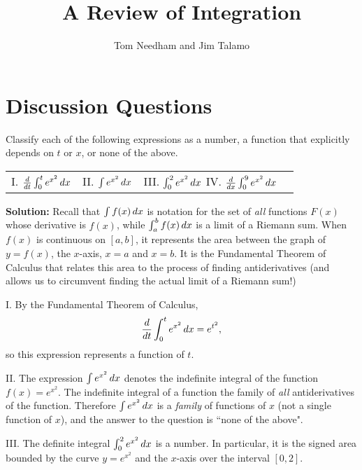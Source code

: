 \documentclass[handout,hints]{ximera}
\author{Tom Needham and Jim Talamo}
\title[]{A Review of Integration}
\begin{document}
\begin{abstract}
\end{abstract}
\maketitle

\vspace{-0.9in}

\section{Discussion Questions}

\begin{problem}
Classify each of the following expressions as a number, a function that explicitly depends on $t$ or $x$, or none of the above.


\begin{tabular}{llll}
I. $\frac{\mathop{}\!d}{\mathop{}\!d t} \int_0^t e^{x^2} \mathop{}\!d x$ \hspace{0.2in} & II. $\int e^{x^2} \mathop{}\!d x$ \hspace{0.2in} & III. $\int_0^2 e^{x^2} \mathop{}\!d x$ \hspace{0.2in}
IV. $\frac{d}{dx} \int_0^9 e^{x^2} \mathop{}\!d x$
\end{tabular}

\end{problem}

\textbf{Solution:} 
Recall that $\int f(x) \mathop{}\!d x$ is notation for the set of \emph{all} functions $F(x)$ whose derivative is $f(x)$, while $\int_a^b f(x) \mathop{}\!d x$ is a limit of a Riemann sum.  When $f(x)$ is continuous on $[a,b]$, it represents the area between the graph of $y=f(x)$, the $x$-axis, $x=a$ and $x=b$.
It is the Fundamental Theorem of Calculus that relates this area to the process of finding antiderivatives (and allows us to circumvent finding the actual limit of a Riemann sum!)

I. By the Fundamental Theorem of Calculus, 
$$
\frac{\mathop{}\!d}{\mathop{}\!d t} \int_0^t e^{x^2} \mathop{}\!d x = e^{t^2},
$$
so this expression represents a function of $t$.

II. The expression $\int e^{x^2} \mathop{}\!d x$ denotes the indefinite integral of the function $f(x)=e^{x^2}$. The indefinite integral of a function the family of \textit{all} antiderivatives of the function. Therefore $\int e^{x^2} \mathop{}\!d x$ is a \emph{family} of functions of $x$ (not a single function of $x$), and the answer to the question is ``none of the above".

III. The definite integral $\int_0^2 e^{x^2} \mathop{}\!d x$ is a number. In particular, it is the signed area bounded by the curve $y=e^{x^2}$ and the $x$-axis over the interval $[0,2]$. 
\end{document}
